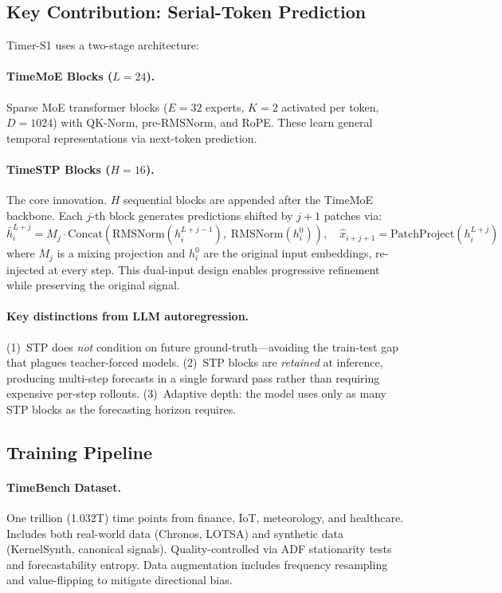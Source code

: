 \documentclass[11pt]{article}
\begin{document}
\subsection{Key Contribution: Serial-Token Prediction}

Timer-S1 uses a two-stage architecture:

\paragraph{TimeMoE Blocks ($L{=}24$).} Sparse MoE transformer blocks ($E{=}32$ experts, $K{=}2$ activated per token, $D{=}1024$) with QK-Norm, pre-RMSNorm, and RoPE. These learn general temporal representations via next-token prediction.

\paragraph{TimeSTP Blocks ($H{=}16$).} The core innovation. $H$ sequential blocks are appended after the TimeMoE backbone. Each $j$-th block generates predictions shifted by $j{+}1$ patches via:
\begin{equation}
    \bar{h}_i^{L+j} = M_j \cdot \text{Concat}\!\left(\text{RMSNorm}(h_i^{L+j-1}),\; \text{RMSNorm}(h_i^0)\right), \quad \hat{x}_{i+j+1} = \text{PatchProject}(h_i^{L+j})
\end{equation}
where $M_j$ is a mixing projection and $h_i^0$ are the original input embeddings, re-injected at every step. This dual-input design enables progressive refinement while preserving the original signal.

\paragraph{Key distinctions from LLM autoregression.} (1)~STP does \emph{not} condition on future ground-truth---avoiding the train-test gap that plagues teacher-forced models. (2)~STP blocks are \emph{retained} at inference, producing multi-step forecasts in a single forward pass rather than requiring expensive per-step rollouts. (3)~Adaptive depth: the model uses only as many STP blocks as the forecasting horizon requires.

\subsection{Training Pipeline}

\paragraph{TimeBench Dataset.} One trillion (1.032T) time points from finance, IoT, meteorology, and healthcare. Includes both real-world data (Chronos, LOTSA) and synthetic data (KernelSynth, canonical signals). Quality-controlled via ADF stationarity tests and forecastability entropy. Data augmentation includes frequency resampling and value-flipping to mitigate directional bias.
\end{document}
